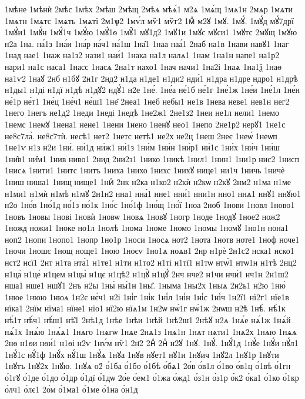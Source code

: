 {1мѣне
1мѣнѝ
2мѣс
1мѣх
2мѣш
2мѣщ
2мѣѧ
мѣѧ́1
м2ѧ
1мѧ́щ
1мѧ1н
2мѧр
1мѧти
1мѧтн
1мѧтс
1мѧть
1мѧтї
2м1ѱ2
1мѵ́л
мѷ1
мѷг2
1мⷣ
м2ꙋ
1мꙋ.
1мꙋ́.
1мꙋ́д
мꙋ́7дрї
1мꙋ́и1
1мꙋ́н
1мꙋ́1ч
1мꙋ́ю
1мꙋ́1ѳ
1мꙋ̑1
мꙋ1д2
1мꙋ1и
1мꙋс
мꙋси1
1мꙋтс
2мꙋщ
1мꙋю
н2а
1на.
на́1з
1на́и
1на́р
на́ч1
на́1ш
1на̑1
1наа
наа́1
2наб
на1в
1нави
навꙋ1
1наг
1над
нае1
1наж
на1з2
нази1
наи́1
1нака
на1л
налѧ1
1нам
1на1н
напе1
на1р2
нари1
на1с
наса1
1насс
1насѧ
2на1т
нахо1
1нач
начи1
1на2і
1наѧ
1на1ѯ
1наѳ
на1ѵ2
1наꙋ
2нб
н1бꙋ
2н1г
2нд2
н1да
н1де1
н1ди2
нди́1
н1дра
н1дре
ндро1
н1дрѣ
н1ды1
н1ді
н1дї
н1дѣ
н1дꙋ2
ндꙋ́1
н2е
1не́.
1не́а
не́1б
не́1г
1не́1ж
1не́и
1не́1л
1не́н
не́1р
не́т1
1не́ц
1не́ч1
не́ш1
1не̑
2неа1
1неб
небы1
не1в
1нева
неве1
нев1н
нег2
1него
1негъ
не1д2
1неди
1неді
1недѣ
1не2ж1
2не1з2
1неи
не1л
нели1
1немо
1немс
1немꙋ
1нена1
нене1
1нени
1нено
1ненꙋ
нео1
1непо
2не1р2
нерꙋ1
1не1с
не8с7ла̀.
не8с7тѝ.
несѣ1
нет2
1нетс
нетѣ1
не2х
не2ц
1неш
2неє
1неѡ́
1неѡп
1не1ѵ
н1з
н2и
1ни́.
ни́1д
ни́ж1
ни́1з
1ни́м
1ни́н
1ни́р1
ни́1с
1ни́х
1ни́ч
1ни́ш
1ни̑в1
ни̑м1
1нив
ниво1
2нид
2ни2з1
1нико
1никѣ
1нил1
1нин1
1ни1р
нис2
1нисп
1нисѧ
1нити1
1нитс
1нитъ
1ниха
1нихо
1нихс
1нихꙋ
нице1
ни1ч
1ничь
1ничѐ
1ниш
ниша1
1нищ
нище1
1ниⷯ
2нк
н2ка
н1ко2
н2кѝ
н2кѡ
н2кꙋ
2нм2
н1ма
н1ме
н1ми1
н1мѝ
н1мѣ
н1мꙋ
2н1н2
нна1
нна́1
нне1
нни́1
нни1н
нно1
ннѧ1
ннꙋ1
ннꙋю1
н2о
1но́в
1но́1д
но́1з
но́1к
1но́с
1но́1ф
1но́щ
1но́ї
1ноа
2ноб
1нови
1новл
1ново1
1новъ
1новы
1нові
1новѝ
1новѡ
1новѧ
1новꙋ
1ногр
1ноде
1нодꙋ
1ное2
нож2
1ножд
ножи1
1ноке
но1л
1нолѣ
1нома
1номе
1номо
1номы
1номꙋ
1но1н
нона1
ноп2
1нопи
1нопо1
1нопр
1но1р
1носи
1носѧ
нот2
1нота
1нотв
ноте1
1ноф
ноче1
1ночи
1ношє
1нощ
ноще1
1ною
1ноєѵ
1но1ѧ
ноѧв1
2нр
н1рѐ
2н1с2
нска1
нско1
нст2
нсї1
2нт
н1та
нта́1
н1те1
н1ти
н1то2
н1ті
н1тї1
н1тѡ
нтѡ́1
нтѡ1н
н1тѣ
2нц2
н1ца̀
н1це́
н1цем
н1цы̀
н1цє
н1цѣ2
н1цꙋ̀
н1цꙋ́
2нч
нче2
н1чи
нчи́1
нч1н
2н1ш2
нша1
нше1
ншꙋ1
2нъ
н2ы
1ны̀
ны́1н
1ны̑.
1ныма
1ны2х
1ныѧ
2н2ь1
н2ю
1ню́
1нюе
1нюю
1нюѧ
1н2є
нє́ч1
н2і
1ні́г
1ні́к
1ні́л
1ні́н
1ні́с
1ні́ч
1н2ї1
нї2г1
нїе1в
нїка1
2нїм
нїма1
нїне1
нїо1
нї2ю
нїѧ1м
1н2ѡ
нѡ́1г
нѡ́1ж
2нѡш
н2ѣ
1нѣ́.
нѣ́1к
нѣ́1т
нѣ́ч1
нѣ́ш1
нѣ̑1
2нѣ1д
1нѣе
1нѣи
1нѣй
1нѣ2ш1
2нѣꙋ
н2ѧ
1нѧ́е
нѧ́1ж
1нѧ́й
нѧ́1х
1нѧ́ю
1нѧ́ѧ1
1нѧго
1нѧгѡ
1нѧе
2нѧ1з
1нѧ1н
1нѧт
нѧти1
1нѧ2х
1нѧю
1нѧѧ
2нѳ
н1ѳи
нѳи́1
н1ѳі
н2ѵ
1нѵ́м
нѷ1
2н҃2
2нⷣ
2нⷴ
н2ꙋ
1нꙋ.
1нꙋ́.
1нꙋ́1д
1нꙋ́е
1нꙋ́и
нꙋ́л1
1нꙋ́1с
нꙋ́1ф
1нꙋ́х
нꙋ́1ш
1нꙋ́ѧ
1нꙋа
1нꙋв
нꙋет1
нꙋ1и
1нꙋич
1нꙋ2л
1нꙋ1р
1нꙋти
1нꙋтъ
1нꙋ2х
1нꙋю.
1нꙋѧ
о2́
о́1ба
о́1бо
о́1бѣ
о́бѧ1
2о́в
о́в1л
о́1во
о́в1ц
о́1вѣ
о́1гн
о́1гꙋ
о́1де
о́1до
о́1др
о́1дї
о́1дѡ
2о́е
о́ем1
о́1жа
о́жд1
о́з1н
о́з1р
о́к2
о́ка1
о́1ко
о́1кр
о́лч1
о́лє1
2о́м
о́1ма1
о́1ме
о́1на
о́н1д
}
